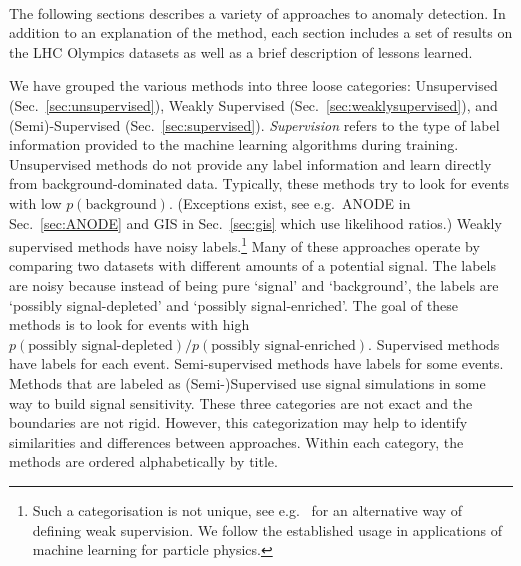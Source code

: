 \documentclass[a4paper,11pt]{article}
\begin{document}
\clearpage




\\

\noindent The following sections describes a variety of approaches to anomaly detection.  In addition to an explanation of the method, each section includes a set of results on the LHC Olympics datasets as well as a brief description of lessons learned.  

We have grouped the various methods into three loose categories: Unsupervised (Sec.~\ref{sec:unsupervised}), Weakly Supervised (Sec.~\ref{sec:weaklysupervised}), and (Semi)-Supervised (Sec.~\ref{sec:supervised}).  \textit{Supervision} refers to the type of label information provided to the machine learning algorithms during training.  Unsupervised methods do not provide any label information and learn directly from background-dominated data.  Typically, these methods try to look for events with low $p(\text{background})$. (Exceptions exist, see e.g.\  ANODE in Sec.~\ref{sec:ANODE} and GIS in Sec.~\ref{sec:gis} which use likelihood ratios.) Weakly supervised methods have noisy labels.\footnote{Such a categorisation is not unique, see e.g.~\cite{zhou2018brief} for an alternative way of defining weak supervision.  We follow the established usage in applications of machine learning for particle physics.}
Many of these approaches operate by comparing two datasets with different amounts of a potential signal.  The labels are noisy because instead of being pure `signal' and `background', the labels are `possibly signal-depleted' and `possibly signal-enriched'.  The goal of these methods is to look for events with high $p(\text{possibly signal-depleted})/p(\text{possibly signal-enriched})$.  Supervised methods have labels for each event.  Semi-supervised methods have labels for some events.  Methods that are labeled as (Semi-)Supervised use signal simulations in some way to build signal sensitivity.  These three categories are not exact and the boundaries are not rigid.  However, this categorization may help to identify similarities and differences between approaches.  Within each category, the methods are ordered alphabetically by title.
\end{document}
